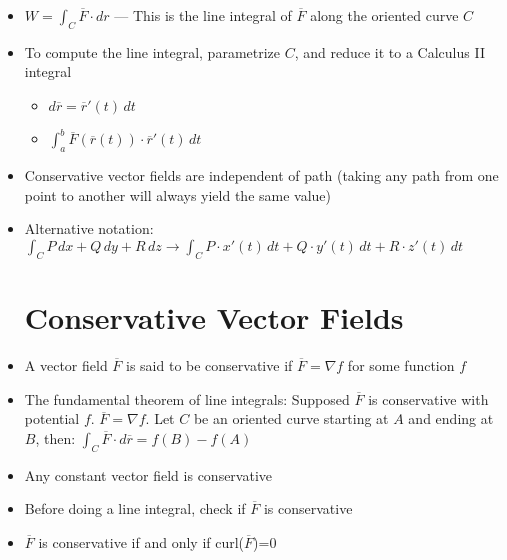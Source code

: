 \begin{itemize}
  \item $W=\displaystyle \int_C \overline{F}\cdot dr$ — This is the line integral of $\overline{F}$ along the oriented curve $C$

  \item To compute the line integral, parametrize $C$, and reduce it to a Calculus II integral

    \begin{itemize}

      \item $d\overline{r} = \overline{r}'(t)\,dt$

      \item $\displaystyle \int_a^b \overline{F}(\overline{r}(t))\cdot \overline{r}'(t)\,dt$

    \end{itemize}

  \item Conservative vector fields are independent of path (taking any path from one point to another will always yield the same value)

  \item Alternative notation: $\displaystyle \int_C P\,dx + Q\,dy + R\,dz \rightarrow \int_C P\cdot x'(t)\,dt + Q\cdot y'(t)\,dt + R\cdot z'(t)\,dt$

    \section{Conservative Vector Fields}

  \item A vector field $\overline{F}$ is said to be conservative if $\overline{F} = \nabla f$ for some function $f$

  \item The fundamental theorem of line integrals: Supposed $\overline{F}$ is conservative with potential $f$. $\overline{F}=\nabla f$. Let $C$ be an oriented curve starting at $A$ and ending at $B$, then: $\displaystyle \int_C \overline{F}\cdot d\overline{r}=f(B)-f(A)$

  \item Any constant vector field is conservative

  \item Before doing a line integral, check if $\overline{F}$ is conservative

  \item $\overline{F}$ is conservative if and only if curl($\overline{F}$)=0

\end{itemize}



